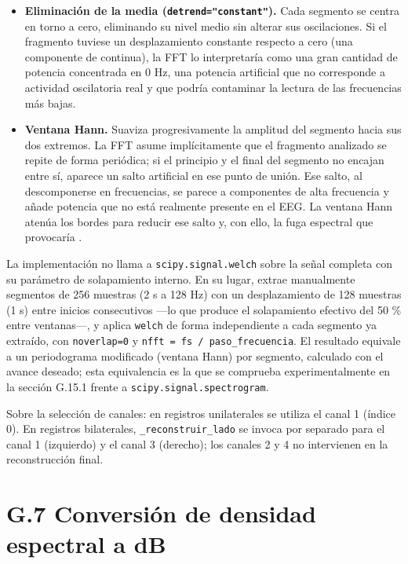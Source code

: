 \documentclass[
  spanish,
  a4paper,
  12pt,
  twoside]{memoir}
\providecommand{\tightlist}{%
  \setlength{\itemsep}{0pt}\setlength{\parskip}{0pt}}
\begin{document}
\begin{itemize}
\tightlist
\item
  \textbf{Eliminación de la media (\texttt{detrend="constant"}).} Cada
  segmento se centra en torno a cero, eliminando su nivel medio sin
  alterar sus oscilaciones. Si el fragmento tuviese un desplazamiento
  constante respecto a cero (una componente de continua), la FFT lo
  interpretaría como una gran cantidad de potencia concentrada en 0 Hz,
  una potencia artificial que no corresponde a actividad oscilatoria
  real y que podría contaminar la lectura de las frecuencias más bajas.
\item
  \textbf{Ventana Hann.} Suaviza progresivamente la amplitud del
  segmento hacia sus dos extremos. La FFT asume implícitamente que el
  fragmento analizado se repite de forma periódica; si el principio y el
  final del segmento no encajan entre sí, aparece un salto artificial en
  ese punto de unión. Ese salto, al descomponerse en frecuencias, se
  parece a componentes de alta frecuencia y añade potencia que no está
  realmente presente en el EEG. La ventana Hann atenúa los bordes para
  reducir ese salto y, con ello, la fuga espectral que provocaría
  \citep{OppenheimSchafer2014}.
\end{itemize}

La implementación no llama a \texttt{scipy.signal.welch} sobre la señal
completa con su parámetro de solapamiento interno. En su lugar, extrae
manualmente segmentos de 256 muestras (2 s a 128 Hz) con un
desplazamiento de 128 muestras (1 s) entre inicios consecutivos ---lo
que produce el solapamiento efectivo del 50 \% entre ventanas---, y
aplica \texttt{welch} de forma independiente a cada segmento ya
extraído, con \texttt{noverlap=0} y
\texttt{nfft\ =\ fs\ /\ paso\_frecuencia}. El resultado equivale a un
periodograma modificado (ventana Hann) por segmento, calculado con el
avance deseado; esta equivalencia es la que se comprueba
experimentalmente en la sección G.15.1 frente a
\texttt{scipy.signal.spectrogram}.

Sobre la selección de canales: en registros unilaterales se utiliza el
canal 1 (índice 0). En registros bilaterales,
\texttt{\_reconstruir\_lado} se invoca por separado para el canal 1
(izquierdo) y el canal 3 (derecho); los canales 2 y 4 no intervienen en
la reconstrucción final.

\chapter{G.7 Conversión de densidad espectral a
dB}\label{g.7-conversiuxf3n-de-densidad-espectral-a-db}
\end{document}
